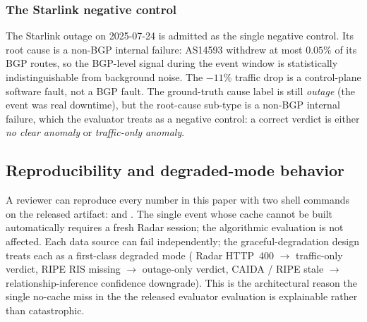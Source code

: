 \subsubsection{The Starlink negative control}
\label{sec:neg-trl}

The Starlink outage on 2025-07-24 is admitted as the single
negative control. Its root cause is a non-BGP internal failure:
AS14593 withdrew at most $0.05\%$ of its BGP routes, so the
BGP-level signal during the event window is statistically
indistinguishable from background noise. The $-11\%$ traffic
drop is a control-plane software fault, not a BGP fault. The
ground-truth cause label is still \emph{outage} (the event was
real downtime), but the root-cause sub-type is a non-BGP
internal failure, which the evaluator treats as a negative
control: a correct verdict is either \emph{no clear anomaly}
or \emph{traffic-only anomaly}.

\subsection{Reproducibility and degraded-mode behavior}
\label{sec:reproducibility}

A reviewer can reproduce every number in this paper with
two shell commands on the released artifact:
 and
. The single
event whose cache cannot be built automatically
 requires a
fresh \cf{} Radar session; the algorithmic evaluation is
not affected. Each data source can fail independently;
the graceful-degradation design treats each as a
first-class degraded mode (\cf{} Radar HTTP~400 $\to$
traffic-only verdict, RIPE RIS missing $\to$
outage-only verdict, CAIDA / RIPE stale $\to$
relationship-inference confidence downgrade). This is
the architectural reason the single no-cache miss in the
the released evaluator evaluation is explainable rather than catastrophic.
